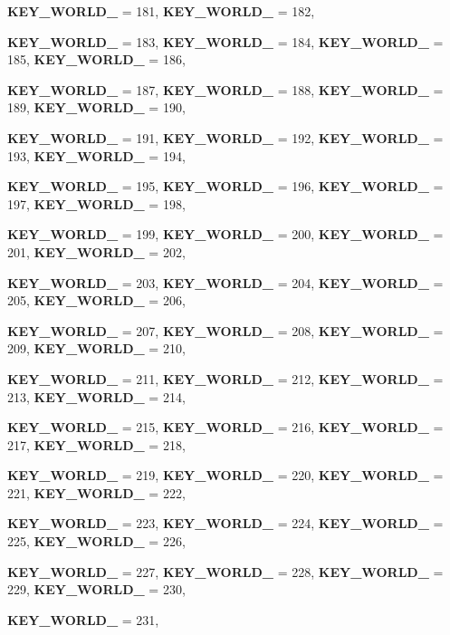 \begin{DoxyCompactItemize}
{\bfseries KEY\_\-WORLD\_} =  181, 
{\bfseries KEY\_\-WORLD\_} =  182, 
\par
{\bfseries KEY\_\-WORLD\_} =  183, 
{\bfseries KEY\_\-WORLD\_} =  184, 
{\bfseries KEY\_\-WORLD\_} =  185, 
{\bfseries KEY\_\-WORLD\_} =  186, 
\par
{\bfseries KEY\_\-WORLD\_} =  187, 
{\bfseries KEY\_\-WORLD\_} =  188, 
{\bfseries KEY\_\-WORLD\_} =  189, 
{\bfseries KEY\_\-WORLD\_} =  190, 
\par
{\bfseries KEY\_\-WORLD\_} =  191, 
{\bfseries KEY\_\-WORLD\_} =  192, 
{\bfseries KEY\_\-WORLD\_} =  193, 
{\bfseries KEY\_\-WORLD\_} =  194, 
\par
{\bfseries KEY\_\-WORLD\_} =  195, 
{\bfseries KEY\_\-WORLD\_} =  196, 
{\bfseries KEY\_\-WORLD\_} =  197, 
{\bfseries KEY\_\-WORLD\_} =  198, 
\par
{\bfseries KEY\_\-WORLD\_} =  199, 
{\bfseries KEY\_\-WORLD\_} =  200, 
{\bfseries KEY\_\-WORLD\_} =  201, 
{\bfseries KEY\_\-WORLD\_} =  202, 
\par
{\bfseries KEY\_\-WORLD\_} =  203, 
{\bfseries KEY\_\-WORLD\_} =  204, 
{\bfseries KEY\_\-WORLD\_} =  205, 
{\bfseries KEY\_\-WORLD\_} =  206, 
\par
{\bfseries KEY\_\-WORLD\_} =  207, 
{\bfseries KEY\_\-WORLD\_} =  208, 
{\bfseries KEY\_\-WORLD\_} =  209, 
{\bfseries KEY\_\-WORLD\_} =  210, 
\par
{\bfseries KEY\_\-WORLD\_} =  211, 
{\bfseries KEY\_\-WORLD\_} =  212, 
{\bfseries KEY\_\-WORLD\_} =  213, 
{\bfseries KEY\_\-WORLD\_} =  214, 
\par
{\bfseries KEY\_\-WORLD\_} =  215, 
{\bfseries KEY\_\-WORLD\_} =  216, 
{\bfseries KEY\_\-WORLD\_} =  217, 
{\bfseries KEY\_\-WORLD\_} =  218, 
\par
{\bfseries KEY\_\-WORLD\_} =  219, 
{\bfseries KEY\_\-WORLD\_} =  220, 
{\bfseries KEY\_\-WORLD\_} =  221, 
{\bfseries KEY\_\-WORLD\_} =  222, 
\par
{\bfseries KEY\_\-WORLD\_} =  223, 
{\bfseries KEY\_\-WORLD\_} =  224, 
{\bfseries KEY\_\-WORLD\_} =  225, 
{\bfseries KEY\_\-WORLD\_} =  226, 
\par
{\bfseries KEY\_\-WORLD\_} =  227, 
{\bfseries KEY\_\-WORLD\_} =  228, 
{\bfseries KEY\_\-WORLD\_} =  229, 
{\bfseries KEY\_\-WORLD\_} =  230, 
\par
{\bfseries KEY\_\-WORLD\_} =  231, 

\end{DoxyCompactItemize}
